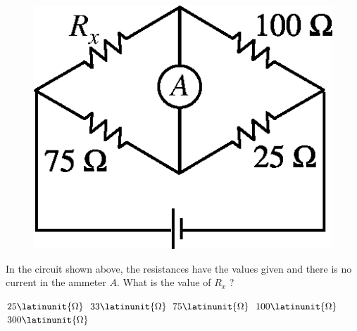 \begin{figure}[H]
\centering
\includegraphics[scale=0.25]{images/img-012-036.png}
\end{figure}

\begin{questions}\setcounter{question}{26}\question
In the circuit shown above, the resistances have the values given and there is no current in the ammeter $A$. What is the value of $R_{x}$ ?

\begin{oneparchoices}
\choice $25 \latinunit{\Omega}$
\choice $33 \latinunit{\Omega}$
\choice $75 \latinunit{\Omega}$
\choice $100 \latinunit{\Omega}$
\choice $300 \latinunit{\Omega}$
\end{oneparchoices}\end{questions}

